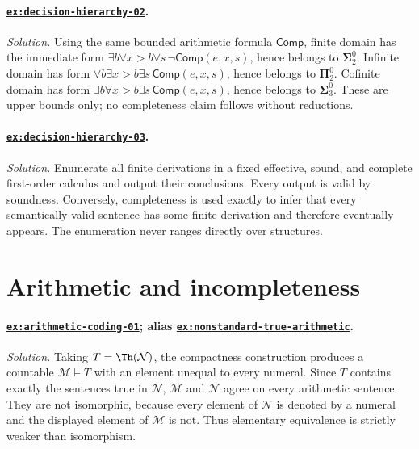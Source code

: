 \paragraph{\hyperref[ex:decision-hierarchy-02]{\texttt{ex:decision-hierarchy-02}}.}
\textit{Solution.}  Using the same bounded arithmetic formula
\(\mathsf{Comp}\), finite domain has
the immediate form
\(\exists b\forall x>b\forall s\,\neg\mathsf{Comp}(e,x,s)\), hence belongs to
\(\boldsymbol{\Sigma}^0_2\).  Infinite domain has form
\(\forall b\exists x>b\exists s\,\mathsf{Comp}(e,x,s)\), hence belongs to
\(\boldsymbol{\Pi}^0_2\).
Cofinite domain has form
\(\exists b\forall x>b\exists s\,\mathsf{Comp}(e,x,s)\), hence belongs to
\(\boldsymbol{\Sigma}^0_3\).
These are upper bounds only; no completeness claim follows without reductions.

\paragraph{\hyperref[ex:decision-hierarchy-03]{\texttt{ex:decision-hierarchy-03}}.}
\textit{Solution.}  Enumerate all finite derivations in a fixed effective,
sound, and complete first-order calculus and output their conclusions.  Every
output is valid by soundness.  Conversely, completeness is used exactly to
infer that every semantically valid sentence has some finite derivation and
therefore eventually appears.  The enumeration never ranges directly over
structures.

\section{Arithmetic and incompleteness}

\paragraph{\hyperref[ex:arithmetic-coding-01]{\texttt{ex:arithmetic-coding-01}};
alias \hyperref[ex:nonstandard-true-arithmetic]{\texttt{ex:nonstandard-true-arithmetic}}.}
\textit{Solution.}  Taking \(T=\Th(\mathcal N)\), the compactness construction
produces a countable \(\mathcal M\models T\) with an element unequal to every
numeral.  Since \(T\) contains exactly the sentences true in \(\mathcal N\),
\(\mathcal M\) and \(\mathcal N\) agree on every arithmetic sentence.  They
are not isomorphic, because every element of \(\mathcal N\) is denoted by a
numeral and the displayed element of \(\mathcal M\) is not.  Thus elementary
equivalence is strictly weaker than isomorphism.

